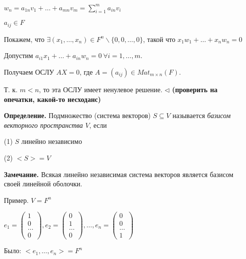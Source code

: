 $w_n = a_{1n}v_1 + \dots + a_{mn} v_m = \sum\limits_{i = 1}^m a_{in} v_i$

$a_{ij} \in F$

\bigskip
Покажем, что $\exists (x_1, \dots, x_n) \in F^n \backslash \{0, 0, \dots, 0\}$, такой что $x_1 w_1 + \dots + x_n w_n = 0$

Допустим $a_{i1} x_1 + \dots + a_{in} w_n = 0 \ \forall i = 1, \dots, m$.

Получаем ОСЛУ $AX = 0$, где $A = (a_{ij}) \in Mat_{m \times n} (F)$.

Т. к. $m < n$, то эта ОСЛУ имеет ненулевое решение. $\lhd$
\textbf{(проверить на опечатки, какой-то несходанс)}

\bigskip
\textbf{Определение.} Подмножество (система векторов) $S \subseteq V$ называется \textit{базисом векторного пространства $V$}, если 

(1) $S$ линейно независимо

(2) $<S> = V$

\bigskip
\textbf{Замечание.} Всякая линейно независимая система векторов является базисом своей линейной оболочки.

\bigskip
Пример. $V = F^n$

$e_1 = \begin{pmatrix} 1 \\ 0 \\ \dots \\ 0  \end{pmatrix}, e_2 = \begin{pmatrix} 0 \\ 1 \\ \dots \\ 0  \end{pmatrix}, \dots, e_n = \begin{pmatrix} 0 \\ 0 \\ \dots \\ 1 \end{pmatrix}$

Было: $<e_1, \dots, e_n> = F^n$

